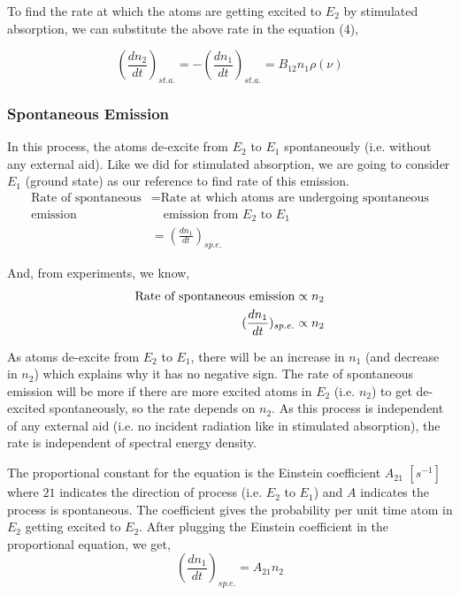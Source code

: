 \documentclass[12pt]{article}
\begin{document}
To find the rate at which the atoms are getting excited to $E_{2}$ by stimulated absorption, we can substitute the above rate in the equation (4),

\begin{equation*}
    (\frac{dn_{2}}{dt})_{st.a.} = -(\frac{dn_{1}}{dt})_{st.a.} = B_{12}n_{1}\rho(\nu)
\end{equation*}

\subsubsection{Spontaneous Emission}

In this process, the atoms de-excite from $E_{2}$ to $E_{1}$ spontaneously (i.e. without any external aid). Like we did for stimulated absorption, we are going to consider $E_{1}$ (ground state) as our reference to find rate of this emission.
\begin{align*}
    \text{Rate of spontaneous} & = \text{Rate at which atoms are undergoing spontaneous} \\
    \text{emission} & \quad \text{emission from } E_{2} \text{ to } E_{1} \\ 
    & = (\frac{dn_{1}}{dt})_{sp.e.}
\end{align*}

And, from experiments, we know, 
\begin{align*}
    \textnormal{Rate of spontaneous emission} \propto n_{2} \\ 
    (\frac{dn_{1}}{dt})_{sp.e.} \propto n_{2}
\end{align*}

As atoms de-excite from $E_{2}$ to $E_{1}$, there will be an increase in $n_{1}$ (and decrease in $n_{2}$) which explains why it has no negative sign. The rate of spontaneous emission will be more if there are more excited atoms in $E_{2}$ (i.e. $n_{2}$) to get de-excited spontaneously, so the rate depends on $n_{2}$. As this process is independent of any external aid (i.e. no incident radiation like in stimulated absorption), the rate is independent of spectral energy density. \vspace{.2cm}

The proportional constant for the equation is the Einstein coefficient $A_{21}$ $[s^{-1}]$ where $21$ indicates the direction of process (i.e. $E_{2}$ to $E_{1}$) and $A$ indicates the process is spontaneous. The coefficient gives the probability per unit time atom in $E_{2}$ getting excited to $E_{2}$. After plugging the Einstein coefficient in the proportional equation, we get,
\begin{equation}
    (\frac{dn_{1}}{dt})_{sp.e.} = A_{21}n_{2}
\end{equation}
\end{document}
